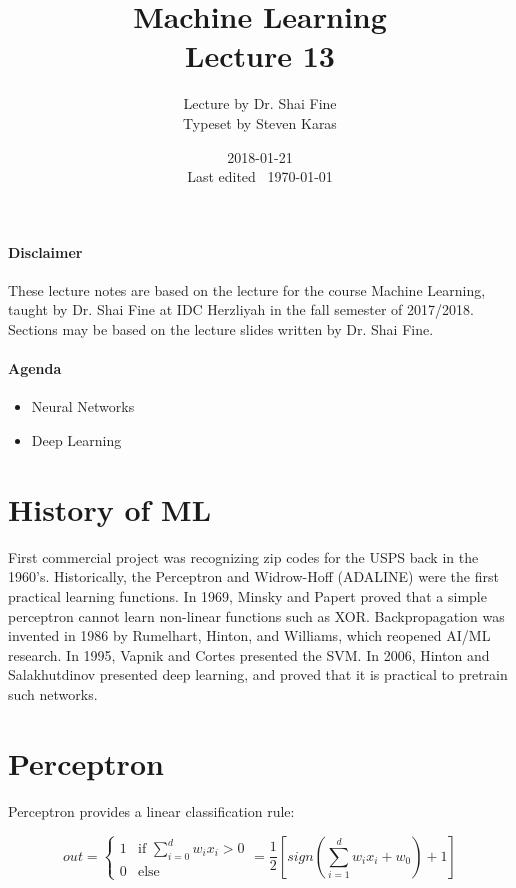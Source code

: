 \documentclass{idc_msc}
\title{Machine Learning\\\large Lecture 13}
\date{2018-01-21 \\ Last edited \currenttime\ \today}
\author{Lecture by Dr. Shai Fine\\Typeset by Steven Karas}
\begin{document}
\maketitle

\paragraph{Disclaimer}

These lecture notes are based on the lecture for the course Machine Learning, taught by Dr. Shai Fine at IDC Herzliyah in the fall semester of 2017/2018.
Sections may be based on the lecture slides written by Dr. Shai Fine.

\paragraph{Agenda}

\begin{itemize}
  \item Neural Networks
  \item Deep Learning
\end{itemize}

\section{History of ML}

First commercial project was recognizing zip codes for the USPS back in the 1960's.
Historically, the Perceptron\cite{rosenblatt1958perceptron} and Widrow-Hoff (ADALINE)\cite{widrow1960adaptive} were the first practical learning functions.
In 1969, Minsky and Papert\cite{minsky1969perceptrons} proved that a simple perceptron cannot learn non-linear functions such as XOR.
Backpropagation was invented in 1986 by Rumelhart, Hinton, and Williams\cite{rumelhart1985learning}, which reopened AI/ML research.
In 1995, Vapnik and Cortes presented the SVM\cite{cortes1995support}.
In 2006, Hinton and Salakhutdinov presented deep learning\cite{hinton2006reducing}, and proved that it is practical to pretrain such networks.

\section{Perceptron}

Perceptron provides a linear classification rule:

\[out = \begin{cases}1 & \text{if } \sum\limits_{i=0}^d w_i x_i > 0 \\ 0 & \text{else} \end{cases} = \frac{1}{2}\left[sign\left(\sum_{i=1}^d w_i x_i + w_0\right) + 1\right]\]
\end{document}
